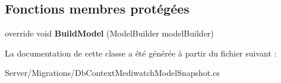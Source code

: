 \subsection*{Fonctions membres protégées}
\begin{DoxyCompactItemize}
\item 
\mbox{\label{class_mediwatch_1_1_server_1_1_migrations_1_1_db_context_mediwatch_model_snapshot_a2b90b9a1956a9ceb7f881aa62d6c8ac3}} 
override void {\bfseries Build\+Model} (Model\+Builder model\+Builder)
\end{DoxyCompactItemize}


La documentation de cette classe a été générée à partir du fichier suivant \+:\begin{DoxyCompactItemize}
\item 
Server/\+Migrations/Db\+Context\+Mediwatch\+Model\+Snapshot.\+cs\end{DoxyCompactItemize}
